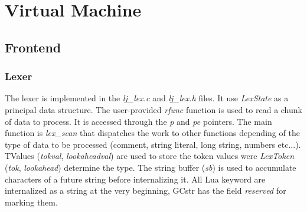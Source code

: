 \chapter{Virtual Machine}
\label{Chapt:VM}
  

\section{Frontend}
\label{Sec:frontend}


\subsection{Lexer}
\label{Subsec:Lexer}

The lexer is implemented in the \emph{lj\_lex.c} and \emph{lj\_lex.h} files.
It use \emph{LexState} as a principal data structure. The user-provided
\emph{rfunc} function is used to read a chunk of data to process. It is accessed
through the \emph{p} and \emph{pe} pointers. The main function is
\emph{lex\_scan} that dispatches the work to other functions depending of the
type of data to be processed (comment, string literal, long string, numbers
etc...). TValues (\emph{tokval}, \emph{lookaheadval}) are used to store the
token values were \emph{LexToken} (\emph{tok}, \emph{lookahead}) determine the
type. The string buffer (\emph{sb}) is used to accumulate characters of a future
string before internalizing it. All Lua keyword are internalized as a string at
the very beginning, GCstr has the field \emph{reserved} for marking them.

